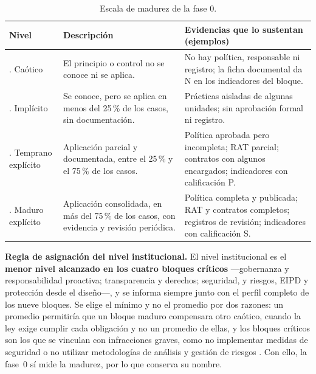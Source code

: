 \begin{table}[htbp]
  \centering
  \caption{Escala de madurez de la fase 0.}
  \label{tab:madurez}
  \scriptsize
  \renewcommand{\arraystretch}{1.15}
  \begin{tabularx}{\textwidth}{|>{\raggedright\arraybackslash}p{2.4cm}|>{\raggedright\arraybackslash}p{3.8cm}|L|}
    \hline
    \textbf{Nivel} & \textbf{Descripción} & \textbf{Evidencias que lo sustentan (ejemplos)} \\
    . Caótico & El principio o control no se conoce ni se aplica. & No hay política, responsable ni registro; la ficha documental da N en los indicadores del bloque. \\ . Implícito & Se conoce, pero se aplica en menos del 25\,\% de los casos, sin documentación. & Prácticas aisladas de algunas unidades; sin aprobación formal ni registro. \\ . Temprano explícito & Aplicación parcial y documentada, entre el 25\,\% y el 75\,\% de los casos. & Política aprobada pero incompleta; RAT parcial; contratos con algunos encargados; indicadores con calificación P. \\ . Maduro explícito & Aplicación consolidada, en más del 75\,\% de los casos, con evidencia y revisión periódica. & Política completa y publicada; RAT y contratos completos; registros de revisión; indicadores con calificación S. \\ \hline
  \end{tabularx}
  \raggedright
\end{table}

\textbf{Regla de asignación del nivel institucional.} El nivel institucional es el \textbf{menor nivel alcanzado en los cuatro bloques críticos} ---gobernanza y responsabilidad proactiva; transparencia y derechos; seguridad, y riesgos, EIPD y protección desde el diseño---, y se informa siempre junto con el perfil completo de los nueve bloques. Se elige el mínimo y no el promedio por dos razones: un promedio permitiría que un bloque maduro compensara otro caótico, cuando la ley exige cumplir cada obligación y no un promedio de ellas, y los bloques críticos son los que se vinculan con infracciones graves, como no implementar medidas de seguridad o no utilizar metodologías de análisis y gestión de riesgos \cite[art.~68]{lopdp2021}. Con ello, la fase~0 sí mide la madurez, por lo que conserva su nombre.


